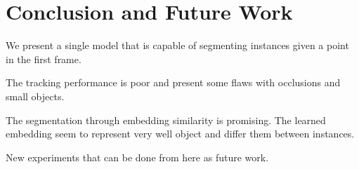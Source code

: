 
\chapter{Conclusion and Future Work}
\label{cha:conclusionsfuturework}

We present a single model that is capable of segmenting instances given a point in the first frame.

The tracking performance is poor and present some flaws with occlusions and small objects.

The segmentation through embedding similarity is promising. The learned embedding seem to represent very well object and differ them between instances.

New experiments that can be done from here as future work.



